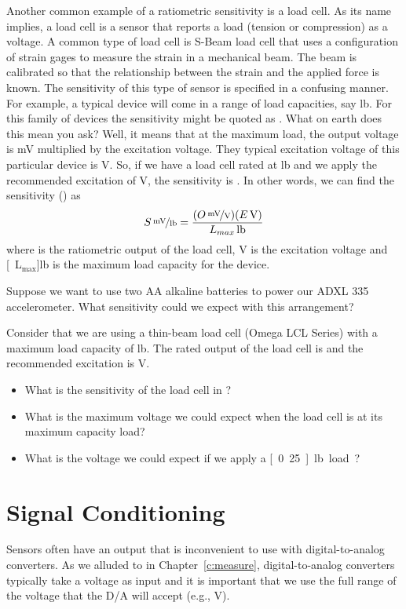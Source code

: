 Another common example of a ratiometric sensitivity is a load cell.  As its name implies, a load cell is a sensor that reports a load (tension or compression) as a voltage.  A common type of load cell is S-Beam load cell that uses a configuration of strain gages to measure the strain in a mechanical beam.  The beam is calibrated so that the relationship between the strain and the applied force is known.  The sensitivity of this type of sensor is specified in a confusing manner.  For example, a typical device will come in a range of load capacities, say \unit[25-10,000]{lb}.  For this family of devices the sensitivity might be quoted as .  What on earth does this mean you ask?  Well, it means that at the maximum load, the output voltage is \unit[3]{mV} multiplied by the excitation voltage.  They typical excitation voltage of this particular device is \unit[10]{V}.  So, if we have a load cell rated at \unit[100]{lb} and we apply the recommended excitation of \unit[10]{V}, the sensitivity is .  In other words, we can find the sensitivity () as
\[
\unitfrac[S]{mV}{lb} = \frac{(\unitfrac[O]{mV}{V})(\unit[E]{V})}{\unit[L_{max}]{lb}}
\]
where  is the ratiometric output of the load cell, \unit[E]{V} is the excitation voltage and \unit[L$_{\mathrm{max}}$]{lb} is the maximum load capacity for the device.
\begin{ex}
Suppose we want to use two AA alkaline batteries to power our ADXL 335 accelerometer.  What sensitivity could we expect with this arrangement?
\end{ex}
\begin{ex}
Consider that we are using a thin-beam load cell (Omega LCL Series) with a maximum load capacity of \unit[1]{lb}.  The rated output of the load cell is  and the recommended excitation is \unit[5]{V}.  
\begin{itemize}
\item What is the sensitivity of the load cell in ?
\item What is the maximum voltage we could expect when the load cell is at its maximum capacity load?
\item What is the voltage we could expect if we apply a \unit[0.25]{lb} load?
\end{itemize}
\end{ex}

\section{Signal Conditioning}
Sensors often have an output that is inconvenient to use with digital-to-analog converters.  As we alluded to in Chapter~\ref{c:measure}, digital-to-analog converters typically take a voltage as input and it is important that we use the full range of the voltage that the D/A will accept (e.g., \unit[0--10]{V}).  

